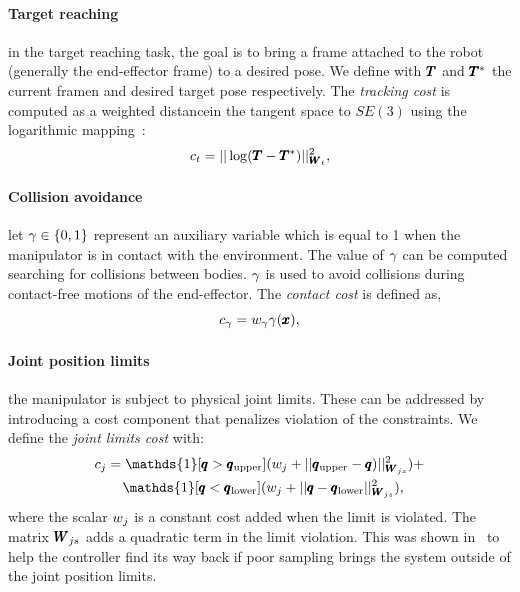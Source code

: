 \paragraph{Target reaching} in the target reaching task, the goal is to bring a frame attached to the robot (generally the end-effector frame) to a desired pose. We define with $\pmb{T}$ and $\pmb{T}^*$ the current framen and desired target pose respectively. The \textit{tracking cost} is computed as a weighted distancein the tangent space to $SE(3)$ using the logarithmic mapping~\cite{blanco2010tutorial}:
\begin{equation} \label{eq:tracking_cost}
     c_{t} = || \log(\pmb{T} - \pmb{T}^{*}) ||^2_{\pmb{W}_{t}},
 \end{equation}
 
 \paragraph{Collision avoidance} let $\gamma \in \{0, 1\}$ represent an auxiliary variable which is equal to 1 when the manipulator is in contact with the environment. The value of $\gamma$ can be computed searching for collisions between bodies. 
 $\gamma$ is used to avoid collisions during contact-free motions of the end-effector. 
 The \textit{contact cost} is defined as,
 \begin{equation}
     c_{\gamma}= w_{\gamma} \gamma(\pmb{x}), 
 \end{equation}

 \paragraph{Joint position limits} the manipulator is subject to physical joint limits. These can be addressed by introducing a cost component that penalizes violation of the constraints. We define the \textit{joint limits cost} with:
 \begin{align}
     &c_{j} = \mathds{1}[\configRobot > \upperLimits](\weightScalar{j} + ||\upperLimits - \configRobot)||^2_{\weightMatrix{js}}) + \nonumber\\ 
     &\qquad\mathds{1}[\configRobot < \lowerLimits](\weightScalar{j} +  || \configRobot - \lowerLimits||^2_{\weightMatrix{js}}), 
 \end{align}
 where the scalar $w_{j}$ is a constant cost added when the limit is violated. The matrix $\pmb{W}_{js}$ adds a quadratic term in the limit violation. This was shown in~\cite{williams_information-theoretic_2018} to help the controller find its way back if poor sampling brings the system outside of the joint position limits.
 
